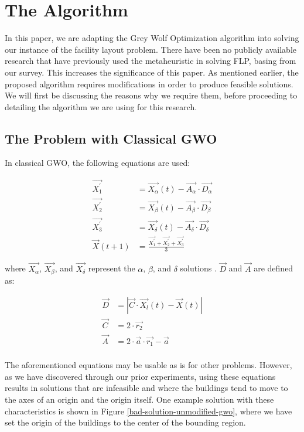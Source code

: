 \section{The Algorithm}
In this paper, we are adapting the Grey Wolf Optimization algorithm into solving our instance of the facility layout problem. There have been no publicly available research that have previously used the metaheuristic in solving FLP, basing from our survey. This increases the significance of this paper. As mentioned earlier, the proposed algorithm requires modifications in order to produce feasible solutions. We will first be discussing the reasons why we require them, before proceeding to detailing the algorithm we are using for this research.

\subsection{The Problem with Classical GWO}
In classical GWO, the following equations are used:

\begin{align}
	\vec{X_{1}^{'}} &= \vec{X_{\alpha}}(t) - \vec{A_{\alpha}} \cdot \vec{D_{\alpha}} \label{gwo-x1-eqn} \\
	\vec{X_{2}^{'}} &= \vec{X_{\beta}}(t) - \vec{A_{\beta}} \cdot \vec{D_{\beta}} \\
	\vec{X_{3}^{'}} &= \vec{X_{\delta}}(t) - \vec{A_{\delta}} \cdot \vec{D_{\delta}} \label{gwo-x3-eqn} \\
	\vec{X}(t + 1)  &= \frac{\vec{X_{1}^{'}} + \vec{X_{2}^{'}} + \vec{X_{3}^{'}}}{3} \label{gwo-xt1-eqn}
\end{align}

where $\vec{X_{\alpha}}$, $\vec{X_{\beta}}$, and $\vec{X_{\delta}}$ represent the $\alpha$, $\beta$, and $\delta$ solutions \cite{Gupta2018}. $\vec{D}$ and $\vec{A}$ are defined as:

\begin{align*}
	\vec{D}        &= \left | \vec{C} \cdot \vec{X_{l}}(t)
	- \vec{X}(t) \right | \\
	\vec{C}        &= 2 \cdot \vec{r_{2}} \\
	\vec{A}        &= 2 \cdot \vec{a} \cdot \vec{r_{1}}
					  - \vec{a}                \\
\end{align*}

The aforementioned equations may be usable as is for other problems. However, as we have discovered through our prior experiments, using these equations results in solutions that are infeasible and where the buildings tend to move to the axes of an origin and the origin itself. One example solution with these characteristics is shown in Figure \ref{bad-solution-unmodified-gwo}, where we have set the origin of the buildings to the center of the bounding region.

